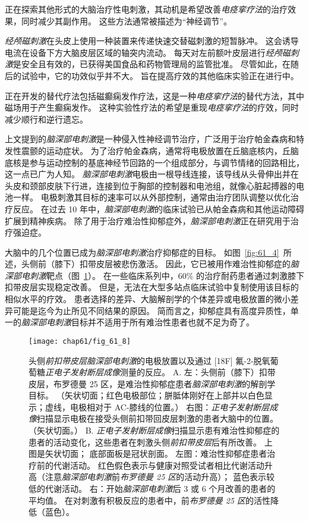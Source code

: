 正在探索其他形式的大脑治疗性电刺激，其动机是希望改善\textit{电痉挛疗法}的治疗效果，同时减少其副作用。
这些方法通常被描述为“神经调节”。


\textit{经颅磁刺激}在头皮上使用一种装置来传递快速交替磁刺激的短暂脉冲。
这会诱导电流在设备下方大脑皮层区域的轴突内流动。
每天对左前额叶皮层进行\textit{经颅磁刺激}是安全且有效的，已获得美国食品和药物管理局的监管批准。
尽管如此，在随后的试验中，它的功效似乎并不大。
旨在提高疗效的其他临床实验正在进行中。


正在开发的替代疗法包括磁癫痫发作疗法，这是一种\textit{电痉挛疗法}的替代方法，其中磁场用于产生癫痫发作。
这种实验性疗法的希望是重现\textit{电痉挛疗法}的疗效，同时减少顺行和逆行遗忘。


上文提到的\textit{脑深部电刺激}是一种侵入性神经调节治疗，广泛用于治疗帕金森病和特发性震颤的运动症状。
为了治疗帕金森病，通常将电极放置在丘脑底核内，丘脑底核是参与运动控制的基底神经节回路的一个组成部分，与调节情绪的回路相比，这一点已广为人知。
\textit{脑深部电刺激}电极由一根导线连接，该导线从头骨伸出并在头皮和颈部皮肤下行进，连接到位于胸部的控制器和电池组，就像心脏起搏器的电池一样。
电极刺激其目标的速率可以从外部控制，通常由治疗团队调整以优化治疗反应。
在过去 10 年中，\textit{脑深部电刺激}的临床试验已从帕金森病和其他运动障碍扩展到精神疾病。
除了用于治疗难治性抑郁症外，\textit{脑深部电刺激}正在研究用于治疗强迫症。


大脑中的几个位置已成为\textit{脑深部电刺激}治疗抑郁症的目标。
如图~\ref{fig:61_4}~所述，头侧前（膝下）扣带皮层被悲伤激活。
因此，它已被用作难治性抑郁症的\textit{脑深部电刺激}靶点（图~\ref{fig:61_8}）。
在一些临床系列中，60\% 的治疗耐药患者通过刺激膝下扣带皮层实现稳定改善。
但是，无法在大型多站点临床试验中复制使用该目标的相似水平的疗效。
患者选择的差异、大脑解剖学的个体差异或电极放置的微小差异可能是迄今为止所见不同结果的原因。
简而言之，抑郁症具有高度异质性，单一的\textit{脑深部电刺激}目标并不适用于所有难治性患者也就不足为奇了。


\begin{figure}[htbp]
	\centering
	\texttt{[image: chap61/fig\_61\_8]}
	\caption{头侧\textit{前扣带皮层}\textit{脑深部电刺激}的电极放置以及通过 [18F] 氟-2-脱氧葡萄糖\textit{正电子发射断层成像}测量的反应。
		A. 左：头侧前（膝下）扣带皮层，布罗德曼 25 区，是难治性抑郁症患者\textit{脑深部电刺激}的解剖学目标。
		（矢状切面；红色电极部位；胼胝体刚好在上部并以白色显示；虚线，电极相对于 AC-膝线的位置。）
		右图：\textit{正电子发射断层成像}扫描显示电极在接受头侧前扣带回皮层刺激的患者大脑中的位置。 （矢状切面。）
		B. \textit{正电子发射断层成像}扫描显示患有难治性抑郁症的患者的活动变化，这些患者在刺激头侧\textit{前扣带皮层}后有所改善。
		上图是矢状切面；
		底部面板是冠状剖面。
		左图：难治性抑郁症患者治疗前的代谢活动。 红色假色表示与健康对照受试者相比代谢活动升高（注意\textit{脑深部电刺激}前\textit{布罗德曼 25 区}的活动升高）； 蓝色表示较低的代谢活动。
		右：开始\textit{脑深部电刺激}后 3 或 6 个月改善的患者的平均值。
		在对刺激有积极反应的患者中，前\textit{布罗德曼 25 区}的活性降低（蓝色）。}
	\label{fig:61_8}
\end{figure}


